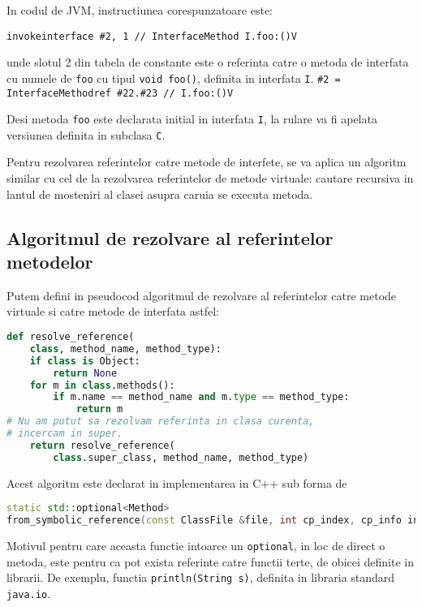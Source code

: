 In codul de JVM, instructiunea corespunzatoare este:

\texttt{invokeinterface \#2,  1            // InterfaceMethod I.foo:()V}

unde slotul 2 din tabela de constante este o referinta catre o metoda de
interfata cu numele de \texttt{foo} cu tipul \texttt{void foo()}, definita in
interfata \texttt{I}.
\texttt{\#2 = InterfaceMethodref \#22.\#23        // I.foo:()V}

Desi metoda \texttt{foo} este declarata initial in interfata \texttt{I}, la
rulare va fi apelata versiunea definita in subclasa \texttt{C}.

Pentru rezolvarea referintelor catre metode de interfete, se va aplica un algoritm similar cu
cel de la rezolvarea referintelor de metode virtuale: cautare recursiva in
lantul de mosteniri al clasei asupra caruia se executa metoda.

\subsection{Algoritmul de rezolvare al referintelor metodelor}

Putem defini in pseudocod algoritmul de rezolvare al referintelor catre metode
virtuale si catre metode de interfata astfel:

\begin{lstlisting}[language=Python]
def resolve_reference(
    class, method_name, method_type):
    if class is Object:
        return None
    for m in class.methods():
        if m.name == method_name and m.type == method_type:
            return m
# Nu am putut sa rezolvam referinta in clasa curenta,
# incercam in super.
    return resolve_reference(
        class.super_class, method_name, method_type)
\end{lstlisting}

Acest algoritm este declarat in implementarea in C++ sub forma de

\begin{lstlisting}[language=C++]
static std::optional<Method>
from_symbolic_reference(const ClassFile &file, int cp_index, cp_info info);
\end{lstlisting}

Motivul pentru care aceasta functie intoarce un \texttt{optional}, in loc de
direct o metoda, este pentru ca pot exista referinte catre functii terte, de
obicei definite in librarii.
De exemplu, functia \texttt{println(String s)}, definita in libraria standard
\texttt{java.io}.


